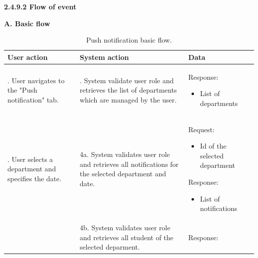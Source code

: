 \indent\textbf{2.4.9.2 Flow of event}
\vspace{0.5em}
\par\indent\indent\textbf{A. Basic flow}
\vspace{-0.5em}
\renewcommand{\arraystretch}{1.5}
\begin{longtable}{|>{\raggedright\arraybackslash}p{4.5cm}|
                  >{\raggedright\arraybackslash}p{6cm}|
                  >{\raggedright\arraybackslash}p{4.5cm}|}                  
\caption{Push notification basic flow.}
\label{tab:notification_management_push_basic_flow}\\
\hline
\centering\textbf{User action} & \centering\textbf{System action} & \centering\arraybackslash\textbf{Data} \\
\hline
\endfirsthead
\endhead
1. User navigates to the "Push notification" tab.&2. System validate user role and retrieves the list of departments which are managed by the user.&
    \par{Response:
        \vspace{-0.8em}
        \begin{itemize}
            \item List of departments
            \vspace{-1.2em}
        \end{itemize}
    }\\
\hline
3. User selects a department and specifies the date.&4a. System validates user role and retrieves all notifications for the selected department and date.&
\par{Request:
        \vspace{-0.8em}
        \begin{itemize}
            \item Id of the selected department
        \end{itemize}
    }
    \vspace{-0.8em}
    \par{Response:
        \vspace{-0.8em}
        \begin{itemize}
            \item List of notifications
            \vspace{-1.5em}
        \end{itemize}
    }\\
\hline
&4b. System validates user role and retrieves all student of the selected deparment.&
    \par{Response:
        \vspace{-0.8em}
}
\end{longtable}
